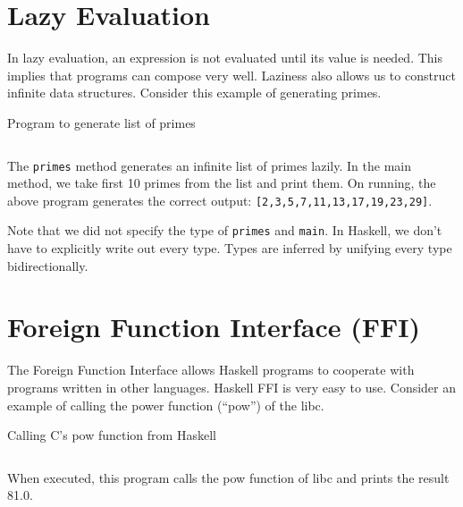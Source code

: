 \section{Lazy Evaluation}
In lazy evaluation, an expression is not evaluated until its value is needed. This implies that programs can compose very well. Laziness also allows us to construct infinite data structures. Consider this example of generating primes.

\begin{program}
  \caption{Program to generate list of primes}
  \label{prog:list-of-primes}
  \inputminted{haskell}{hs/primes.hs}
\end{program}

The \texttt{primes} method generates an infinite list of primes lazily. In the main method, we take first 10 primes from the list and print them. On running, the above program generates the correct output: \texttt{[2,3,5,7,11,13,17,19,23,29]}.

Note that we did not specify the type of \texttt{primes} and \texttt{main}. In Haskell, we don't have to explicitly write out every type. Types are inferred by unifying every type bidirectionally.

\section{Foreign Function Interface (FFI)}
The Foreign Function Interface allows Haskell programs to cooperate with programs written in other languages. Haskell FFI is very easy to use. Consider an example of calling the power function (``pow'') of the libc.

\begin{program}
  \caption{Calling C's pow function from Haskell}
  \label{prog:c-pow}
  \inputminted{haskell}{hs/pow.hs}
\end{program}

When executed, this program calls the pow function of libc and prints the result 81.0.

